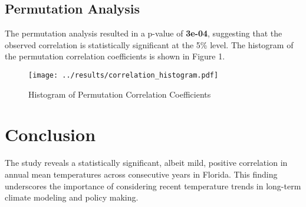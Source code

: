 \documentclass{article}
\begin{document}
\subsection{Permutation Analysis}
The permutation analysis resulted in a p-value of \textbf{3e-04}, suggesting that the observed correlation is statistically significant at the 5\% level. The histogram of the permutation correlation coefficients is shown in Figure 1.

\begin{figure}[h]
\centering
\texttt{[image: ../results/correlation\_histogram.pdf]}
\caption{Histogram of Permutation Correlation Coefficients}
\end{figure}

\section{Conclusion}
The study reveals a statistically significant, albeit mild, positive correlation in annual mean temperatures across consecutive years in Florida. This finding underscores the importance of considering recent temperature trends in long-term climate modeling and policy making.
\end{document}
